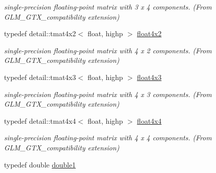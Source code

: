 \begin{CompactItemize}
\begin{CompactList}\small\item\em single-precision floating-point matrix with 3 x 4 components. (From GLM\_\-GTX\_\-compatibility extension) \item\end{CompactList}\item 
\hypertarget{group__gtx__compatibility_gb805aa2d6bbd5edddf78bd2e9322e6c7}{
typedef detail::tmat4x2$<$ float, highp $>$ \hyperlink{group__gtx__compatibility_gb805aa2d6bbd5edddf78bd2e9322e6c7}{float4x2}}
\label{group__gtx__compatibility_gb805aa2d6bbd5edddf78bd2e9322e6c7}

\begin{CompactList}\small\item\em single-precision floating-point matrix with 4 x 2 components. (From GLM\_\-GTX\_\-compatibility extension) \item\end{CompactList}\item 
\hypertarget{group__gtx__compatibility_g72398a5d715031923beca8907c52f5d6}{
typedef detail::tmat4x3$<$ float, highp $>$ \hyperlink{group__gtx__compatibility_g72398a5d715031923beca8907c52f5d6}{float4x3}}
\label{group__gtx__compatibility_g72398a5d715031923beca8907c52f5d6}

\begin{CompactList}\small\item\em single-precision floating-point matrix with 4 x 3 components. (From GLM\_\-GTX\_\-compatibility extension) \item\end{CompactList}\item 
\hypertarget{group__gtx__compatibility_g1f48a19e35b3640cf3d509041f7a800b}{
typedef detail::tmat4x4$<$ float, highp $>$ \hyperlink{group__gtx__compatibility_g1f48a19e35b3640cf3d509041f7a800b}{float4x4}}
\label{group__gtx__compatibility_g1f48a19e35b3640cf3d509041f7a800b}

\begin{CompactList}\small\item\em single-precision floating-point matrix with 4 x 4 components. (From GLM\_\-GTX\_\-compatibility extension) \item\end{CompactList}\item 
\hypertarget{group__gtx__compatibility_gb8b88350212cea916857cb2f49b8a29f}{
typedef double \hyperlink{group__gtx__compatibility_gb8b88350212cea916857cb2f49b8a29f}{double1}}
\label{group__gtx__compatibility_gb8b88350212cea916857cb2f49b8a29f}


\end{CompactItemize}
